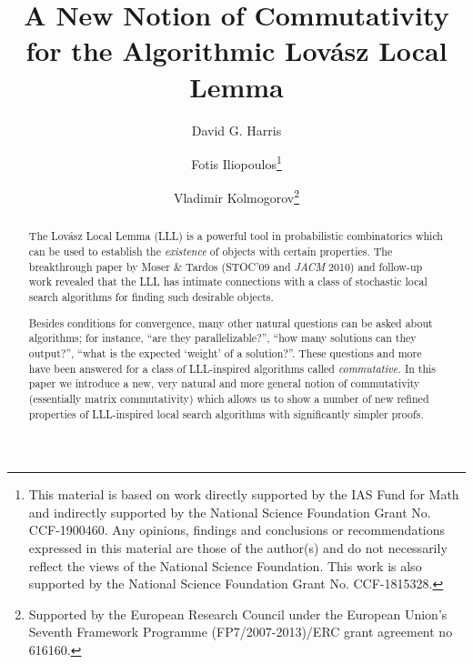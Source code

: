 \documentclass{toc}
\begin{document}
\begin{frontmatter}%

%
%
%

%
\title{A New Notion of Commutativity  for the Algorithmic Lov\'{a}sz Local Lemma}%
%
%
%
%
%
%
%
%
%
%
%
%
%
%
%
%
%
%
%
%
%
%
%
%
%
%
%
%
%
%
%
\author[harris]{David G. Harris}
\author[iliopoulos]{Fotis Iliopoulos\thanks{This material is based on 
work directly supported by the IAS Fund for Math and indirectly supported by the National Science Foundation Grant No. CCF-1900460. Any opinions, findings and conclusions or recommendations expressed in this material are those of the author(s) and do not necessarily reflect the views of the National Science Foundation. This work is also supported by the National Science Foundation Grant No. CCF-1815328.}}
\author[kolmogorov]{Vladimir Kolmogorov\thanks{Supported by the European Research
Council under the European Union's Seventh Framework Programme (FP7/2007-2013)/ERC
grant agreement no 616160.}}

%
%
%
%

%
%
%
%
%
%
%
%
\begin{abstract}
  The Lov\'{a}sz Local Lemma (LLL) is a powerful tool in probabilistic combinatorics
which can be used to establish the \emph{existence} of objects
with certain properties.  The breakthrough paper by Moser \& Tardos
(STOC'09 and \emph{JACM} 2010) and follow-up work 
revealed that the LLL has intimate connections with a class of stochastic 
local search algorithms for finding such desirable objects. 

Besides conditions for convergence, many other natural questions can be asked about
algorithms; for instance, ``are they parallelizable?'', ``how many solutions can
they output?'', ``what is the expected `weight' of a solution?''. These questions
and more have been answered for a class of LLL-inspired algorithms called 
\emph{commutative.} In this paper we introduce a new, very natural and more general
notion  of commutativity (essentially matrix commutativity) which allows us to
show a number of new refined properties of LLL-inspired local search algorithms
with significantly simpler proofs.
\end{abstract}


%

\end{frontmatter}
\end{document}
